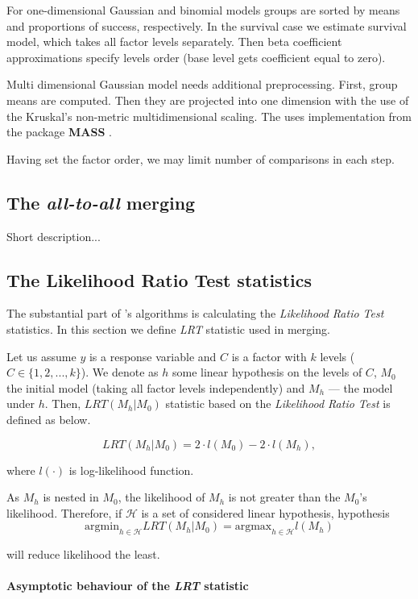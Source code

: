 For one-dimensional Gaussian and binomial models groups are sorted by means and proportions of success, respectively. In the survival case we estimate survival model, which takes all factor levels separately. Then beta coefficient approximations specify levels order (base level gets coefficient equal to zero). 

Multi dimensional Gaussian model needs additional preprocessing. First, group means are computed. Then they are projected into one dimension with the use of the Kruskal's non-metric multidimensional scaling. The \factorMerger uses  implementation from the package \textbf{MASS} \citep{MASS}. 

Having set the factor order, we may limit number of comparisons in each step.


\subsection{The \emph{all-to-all} merging}

Short description...

\subsection{The Likelihood Ratio Test statistics}

The substantial part of \factorMergerTitle 's algorithms is calculating the \emph{Likelihood Ratio Test} statistics. In this section we define \emph{LRT} statistic used in merging.

Let us assume $y$ is a response variable and $C$ is a factor with $k$ levels ($C \in \{1, 2, ..., k \}$). We denote as $h$ some linear hypothesis on the levels of $C$, $M_0$ the initial model (taking all factor levels independently) and $M_h$ --- the model under $h$. Then, $LRT(M_h|M_0)$ statistic based on the \emph{Likelihood Ratio Test} is defined as below.

$$ 
LRT(M_h|M_0) = 2 \cdot l (M_0) - 2 \cdot l (M_h), 
$$

where $l(\cdot)$ is log-likelihood function.

As $M_h$ is nested in $M_0$, the likelihood of $M_h$ is not greater than the $M_0$'s likelihood. Therefore, if $\mathcal{H}$ is a set of considered linear hypothesis, hypothesis 
$$
\mathrm{argmin}_{h \in \mathcal{H}} LRT(M_h|M_0) = \mathrm{argmax}_{h \in \mathcal{H}} l(M_h)
$$

will reduce likelihood the least.

\paragraph{Asymptotic behaviour of the \emph{LRT} statistic} 

